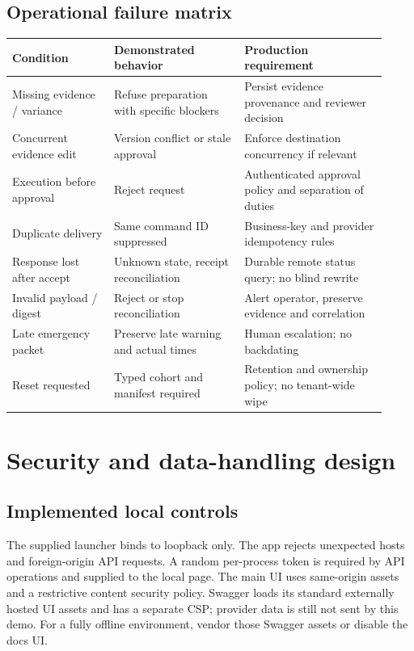 \documentclass[11pt,letterpaper]{article}
\begin{document}
\subsection{Operational failure matrix}
\begin{longtable}{p{0.25\linewidth}p{0.32\linewidth}p{0.35\linewidth}}
\toprule Condition & Demonstrated behavior & Production requirement\\\midrule
Missing evidence / variance & Refuse preparation with specific blockers & Persist evidence provenance and reviewer decision\\
Concurrent evidence edit & Version conflict or stale approval & Enforce destination concurrency if relevant\\
Execution before approval & Reject request & Authenticated approval policy and separation of duties\\
Duplicate delivery & Same command ID suppressed & Business-key and provider idempotency rules\\
Response lost after accept & Unknown state, receipt reconciliation & Durable remote status query; no blind rewrite\\
Invalid payload / digest & Reject or stop reconciliation & Alert operator, preserve evidence and correlation\\
Late emergency packet & Preserve late warning and actual times & Human escalation; no backdating\\
Reset requested & Typed cohort and manifest required & Retention and ownership policy; no tenant-wide wipe\\
\bottomrule
\end{longtable}

\section{Security and data-handling design}
\subsection{Implemented local controls}
The supplied launcher binds to loopback only. The app rejects unexpected hosts and foreign-origin API requests. A random per-process token is required by API operations and supplied to the local page. The main UI uses same-origin assets and a restrictive content security policy. Swagger loads its standard externally hosted UI assets and has a separate CSP; provider data is still not sent by this demo. For a fully offline environment, vendor those Swagger assets or disable the docs UI.
\end{document}
